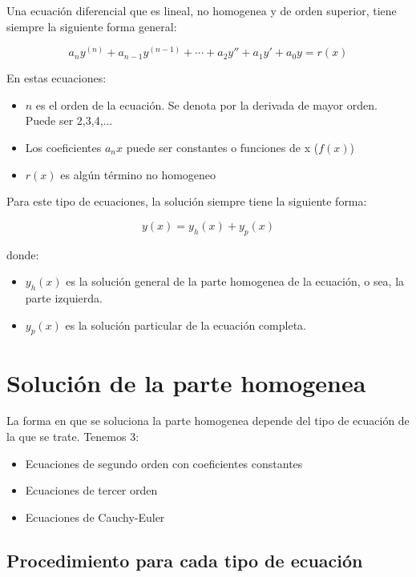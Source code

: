 
Una ecuación diferencial que es lineal, no homogenea y de orden superior, tiene siempre la siguiente forma general:

\begin{equation*}
    a_{n}y^{(n)} + a_{n-1}y^{(n-1)}  + \cdots + a_{2}y'' + a_{1}y' + a_{0}y = r(x)
\end{equation*}

En estas ecuaciones:

\begin{itemize}
    \item $n$ es el orden de la ecuación. Se denota por la derivada de mayor orden. Puede ser 2,3,4,...
    \item Los coeficientes $a_{n}x$ puede ser constantes o funciones de x ($f(x)$)
    \item $r(x)$ es algún término no homogeneo
\end{itemize}

Para este tipo de ecuaciones, la solución siempre tiene la siguiente forma:

\begin{equation*}
    y(x) = y_{h}(x) + y_{p}(x)
\end{equation*}

donde:

\begin{itemize}
    \item $y_{h}(x)$ es la solución general de la parte homogenea de la ecuación, o sea, la parte izquierda.
    \item $y_{p}(x)$ es la solución particular de la ecuación completa.
\end{itemize}

\section{Solución de la parte homogenea}
 
La forma en que se soluciona la parte homogenea depende del tipo de ecuación de la que se trate. Tenemos 3:

\begin{itemize}
    \item Ecuaciones de segundo orden con coeficientes constantes
    \item Ecuaciones de tercer orden
    \item Ecuaciones de Cauchy-Euler
\end{itemize}

\subsection{Procedimiento para cada tipo de ecuación}

